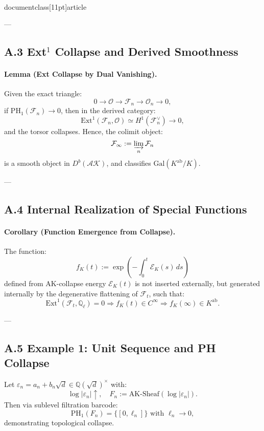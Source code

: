 \\documentclass[11pt]{article}
\begin{document}
---

\subsection*{A.3 Ext$^1$ Collapse and Derived Smoothness}

\paragraph{Lemma (Ext Collapse by Dual Vanishing).}
Given the exact triangle:
\[
0 \to \mathcal{O} \to \mathcal{F}_n \to \mathcal{O}_n \to 0,
\]
if \( \mathrm{PH}_1(\mathcal{F}_n) \to 0 \), then in the derived category:
\[
\mathrm{Ext}^1(\mathcal{F}_n, \mathcal{O}) \simeq H^1(\mathcal{F}_n^\vee) \to 0,
\]
and the torsor collapses. Hence, the colimit object:
\[
\mathcal{F}_\infty := \varinjlim_n \mathcal{F}_n
\]
is a smooth object in \( D^b(\mathcal{AK}) \), and classifies \( \mathrm{Gal}(K^{\mathrm{ab}} / K) \).

---

\subsection*{A.4 Internal Realization of Special Functions}

\paragraph{Corollary (Function Emergence from Collapse).}
The function:
\[
f_K(t) := \exp\left(-\int_0^t \mathcal{E}_K(s)\, ds\right)
\]
defined from AK-collapse energy \(\mathcal{E}_K(t)\) is not inserted externally,  
but generated internally by the degenerative flattening of \( \mathcal{F}_t \), such that:
\[
\mathrm{Ext}^1(\mathcal{F}_t, \mathbb{Q}_\ell) = 0 \Rightarrow f_K(t) \in C^\infty \Rightarrow f_K(\infty) \in K^{\mathrm{ab}}.
\]

---

\subsection*{A.5 Example 1: Unit Sequence and PH Collapse}

Let \( \varepsilon_n = a_n + b_n \sqrt{d} \in \mathbb{Q}(\sqrt{d})^\times \) with:
\[
\log|\varepsilon_n| \uparrow,\quad F_n := \mathrm{AK\text{-}Sheaf}(\log|\varepsilon_n|).
\]
Then via sublevel filtration barcode:
\[
\mathrm{PH}_1(F_n) = \{[0, \ell_n]\} \text{ with } \ell_n \to 0,
\]
demonstrating topological collapse.
\end{document}
